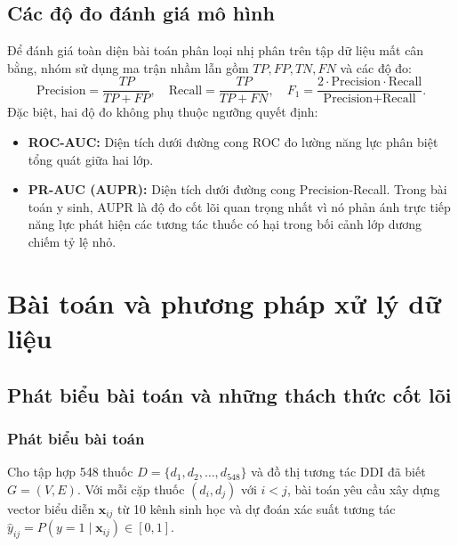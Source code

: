 \documentclass[12pt,a4paper,oneside]{report}
\begin{document}
\section{Các độ đo đánh giá mô hình}
Để đánh giá toàn diện bài toán phân loại nhị phân trên tập dữ liệu mất cân bằng, nhóm sử dụng ma trận nhầm lẫn gồm $TP, FP, TN, FN$ và các độ đo:
\begin{equation}
  \text{Precision} = \frac{TP}{TP + FP}, \quad \text{Recall} = \frac{TP}{TP + FN}, \quad F_1 = \frac{2 \cdot \text{Precision} \cdot \text{Recall}}{\text{Precision} + \text{Recall}}.
\end{equation}
Đặc biệt, hai độ đo không phụ thuộc ngưỡng quyết định:
\begin{itemize}
  \item \textbf{ROC-AUC:} Diện tích dưới đường cong ROC đo lường năng lực phân biệt tổng quát giữa hai lớp.
  \item \textbf{PR-AUC (AUPR):} Diện tích dưới đường cong Precision-Recall. Trong bài toán y sinh, AUPR là độ đo cốt lõi quan trọng nhất vì nó phản ánh trực tiếp năng lực phát hiện các tương tác thuốc có hại trong bối cảnh lớp dương chiếm tỷ lệ nhỏ.
\end{itemize}

\chapter{Bài toán và phương pháp xử lý dữ liệu}
\label{chap:phuongphap}

\section{Phát biểu bài toán và những thách thức cốt lõi}
\subsection{Phát biểu bài toán}
Cho tập hợp 548 thuốc $D = \{d_1, d_2, \dots, d_{548}\}$ và đồ thị tương tác DDI đã biết $G = (V, E)$. Với mỗi cặp thuốc $(d_i, d_j)$ với $i < j$, bài toán yêu cầu xây dựng vector biểu diễn $\mathbf{x}_{ij}$ từ 10 kênh sinh học và dự đoán xác suất tương tác $\hat{y}_{ij} = P(y=1 \mid \mathbf{x}_{ij}) \in [0, 1]$.
\end{document}
